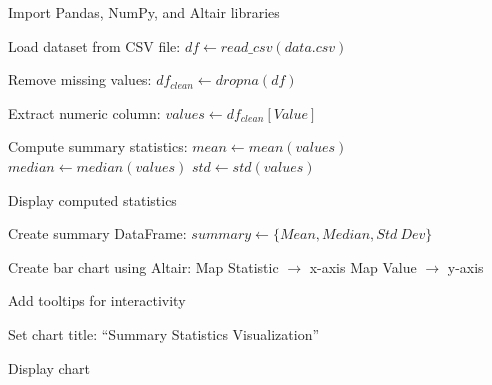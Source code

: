 \begin{algorithm}
\caption{Load CSV, Clean Data, Compute Statistics, and Visualize using Altair}
\begin{algorithmic}[1]

\STATE Import Pandas, NumPy, and Altair libraries

\STATE Load dataset from CSV file:
\STATE $df \gets read\_csv(data.csv)$

\STATE Remove missing values:
\STATE $df_{clean} \gets dropna(df)$

\STATE Extract numeric column:
\STATE $values \gets df_{clean}[Value]$

\STATE Compute summary statistics:
\STATE $mean \gets mean(values)$
\STATE $median \gets median(values)$
\STATE $std \gets std(values)$

\STATE Display computed statistics

\STATE Create summary DataFrame:
\STATE $summary \gets \{Mean, Median, Std\ Dev\}$

\STATE Create bar chart using Altair:
\STATE Map Statistic $\rightarrow$ x-axis
\STATE Map Value $\rightarrow$ y-axis

\STATE Add tooltips for interactivity

\STATE Set chart title: ``Summary Statistics Visualization''

\STATE Display chart

\end{algorithmic}
\end{algorithm}